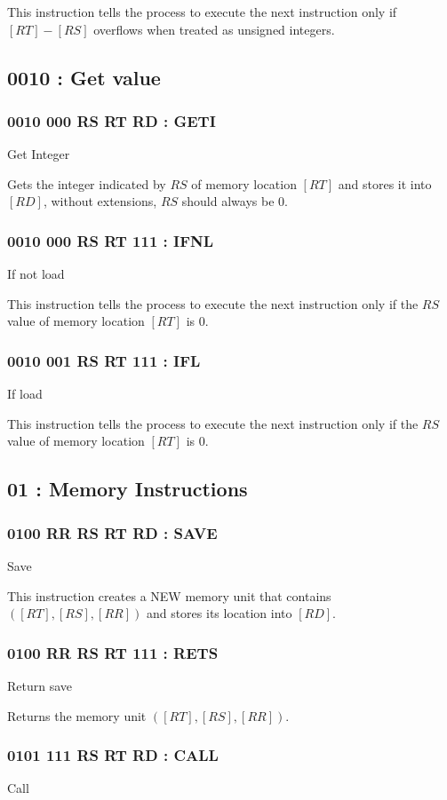 \documentclass[12pt,letterpaper]{report}
\newcommand{\reg}[1]{\left[#1\right]}
\newcommand{\mem}[3]{\left(#1, #2, #3\right)}
\begin{document}
This instruction tells the process to execute the next instruction only if $\reg{RT} - \reg{RS}$ overflows when treated as unsigned integers.
\subsection{0010 : Get value}
\subsubsection{0010 000  RS  RT  RD : GETI}
\label{instruction:GETI}
Get Integer

Gets the integer indicated by $RS$ of memory location $\reg{RT}$ and stores it into $\reg{RD}$, without extensions, $RS$ should always be $0$.
\subsubsection{0010 000  RS  RT 111 : IFNL}
If not load

This instruction tells the process to execute the next instruction only if the $RS$ value of memory location $\reg{RT}$ is $0$.
\subsubsection{0010 001  RS  RT 111 : IFL}
If load

This instruction tells the process to execute the next instruction only if the $RS$ value of memory location $\reg{RT}$ is $0$.
\subsection{01 : Memory Instructions}
\subsubsection{0100  RR  RS  RT  RD : SAVE}
\label{instruction:SAVE}
Save

This instruction creates a NEW memory unit that contains $\mem{\reg{RT}}{\reg{RS}}{\reg{RR}}$ and stores its location into $\reg{RD}$.
\subsubsection{0100  RR  RS  RT 111 : RETS}
\label{instruction:RETS}
Return save

Returns the memory unit $\mem{\reg{RT}}{\reg{RS}}{\reg{RR}}$.
\subsubsection{0101 111  RS  RT  RD : CALL}
\label{instruction:CALL}
Call
\end{document}
